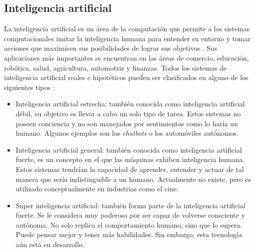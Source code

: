 \subsection{Inteligencia artificial}
La inteligencia artificial es un área de la computación que permite a los sistemas computacionales imitar la inteligencia humana para entender su entorno y tomar acciones que maximicen sus posibilidades de lograr sus objetivos \cite{ai_def}. Sus aplicaciones más importantes se encuentran en las áreas de comercio, educación, robótica, salud, agricultura, automotriz y finanzas\cite{ai_apps}. Todos los sistemas de inteligencia artificial reales e hipotéticos pueden ser clasificados en alguno de los siguientes tipos \cite{ai_types}:
\begin{itemize}
	\item Inteligencia artificial estrecha: también conocida como inteligencia artificial débil, su objetivo es llevar a cabo un solo tipo de tarea. Estos sistemas no poseen conciencia y no son manejados por sentimientos como lo haría un humano. Algunos ejemplos son los \textit{chatbots} o los automóviles autónomos.
	\item Inteligencia artificial general: también conocida como inteligencia artificial fuerte, es un concepto en el que las máquinas exhiben inteligencia humana. Estos sistemas tendrían la capacidad de aprender, entender y actuar de tal manera que sería indistinguible a un humano. Actualmente no existe, pero es utilizado conceptualmente en industrias como el cine.
	\item Super inteligencia artificial: también forma parte de la inteligencia artificial fuerte. Se le considera muy poderosa por ser capaz de volverse consciente y autónoma. No solo replica el comportamiento humano, sino que lo supera. Puede pensar mejor y tener más habilidades. Sin embargo, esta tecnología aún está en desarrollo.
\end{itemize}

